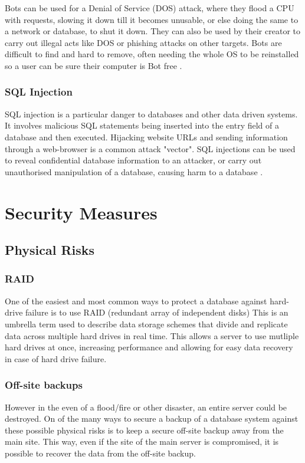 \documentclass[11pt, twocolumn]{article}
\begin{document}
Bots can be used for a Denial of Service (DOS) attack, where they flood a CPU with requests, slowing it down till it becomes unusable, or else doing the same to a network or database, to shut it down.  They can also be used by their creator to carry out illegal acts like DOS or phishing attacks on other targets.  Bots are difficult to find and hard to remove, often needing the whole OS to be reinstalled so a user can be sure their computer is Bot free \cite{Bas}.

\subsubsection{SQL Injection}
SQL injection is a particular danger to databases and other data driven systems.  It involves malicious SQL statements being inserted into the entry field of a database and then executed.  Hijacking website URLs and sending information through a web-browser is a common attack "vector".  SQL injections can be used to reveal confidential database information to an attacker, or carry out unauthorised manipulation of a database, causing harm to a database \cite{Bas}.

\section{Security Measures}
\subsection{Physical Risks}

\subsubsection{RAID}

One of the easiest and most common ways to protect a database against hard-drive failure is to use RAID (redundant array of independent disks)\cite{raid} This is an umbrella term used to describe data storage schemes that divide and replicate data across multiple hard drives in real time. This allows a server to use mutliple hard drives at once, increasing performance and allowing for easy data recovery in case of hard drive failure.

\subsubsection{Off-site backups}

However in the even of a flood/fire or other disaster, an entire server could be destroyed. On of the many ways to secure a backup of a database system against these possible physical risks is to keep a secure off-site backup away from the main site. This way, even if the site of the main server is compromised, it is possible to recover the data from the off-site backup.
\end{document}
